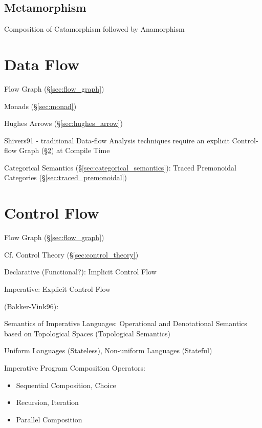 \subsection{Metamorphism}\label{sec:metamorphism}

Composition of Catamorphism followed by Anamorphism



\section{Data Flow}\label{sec:data_flow}

\fist Flow Graph (\S\ref{sec:flow_graph})

Monads (\S\ref{sec:monad})

Hughes Arrows (\S\ref{sec:hughes_arrow})

Shivers91 - traditional Data-flow Analysis techniques require an
explicit Control-flow Graph (\S\ref{sec:control_flow}) at Compile Time

Categorical Semantics (\S\ref{sec:categorical_semantics}): Traced
Premonoidal Categories (\S\ref{sec:traced_premonoidal})



\section{Control Flow}\label{sec:control_flow}

\fist Flow Graph (\S\ref{sec:flow_graph})

\fist Cf. Control Theory (\S\ref{sec:control_theory})

Declarative (Functional?): Implicit Control Flow

Imperative: Explicit Control Flow

(Bakker-Vink96):

Semantics of Imperative Languages: Operational and Denotational
Semantics based on Topological Spaces (Topological Semantics)

Uniform Languages (Stateless), Non-uniform Languages (Stateful)

Imperative Program Composition Operators:
\begin{itemize}
  \item Sequential Composition, Choice
  \item Recursion, Iteration
  \item Parallel Composition
\end{itemize}


